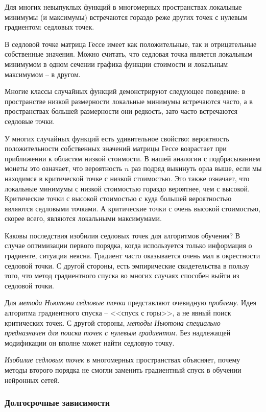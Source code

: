 \documentclass[%
	11pt,
	a4paper,
	utf8,
]{article}
\begin{document}
Для многих невыпуклых функций в многомерных пространствах локальные минимумы (и максимумы) встречаются гораздо реже других точек с нулевым градиентом: седловых точек.

В седловой точке матрица Гессе имеет как положительные, так и отрицательные собственные значения. Можно считать, что седловая точка является локальным минимумом в одном сечении графика функции стоимости и локальным максимумом -- в другом.

Многие классы случайных функций демонстрируют следующее поведение: в пространстве низкой размерности локальные минимумы встречаются часто, а в пространствах большей размерности они редкость, зато часто встречаются седловые точки.

У многих случайных функций есть удивительное свойство: вероятность положительности собственных значений матрицы Гессе возрастает при приближении к областям низкой стоимости. В нашей аналогии с подбрасыванием монеты это означает, что вероятность $ n $ раз подряд выкинуть орла выше, если мы находимся в критической точке с низкой стоимостью. Это также означает, что локальные минимумы с низкой стоимостью гораздо вероятнее, чем с высокой. Критические точки с высокой стоимостью с куда большей вероятностью являются седловыми точками. А критические точки с очень высокой стоимостью, скорее всего, являются локальными максимумами.

Каковы последствия изобилия седловых точек для алгоритмов обучения? В случае оптимизации первого порядка, когда используется только информация о градиенте, ситуация неясна. Градиент часто оказывается очень мал в окрестности седловой точки. С другой стороны, есть эмпирические свидетельства в пользу того, что метод градиентного спуска во многих случаях способен выйти из седловой точки.

Для \emph{метода Ньютона} \emph{седловые точки} представляют очевидную \emph{проблему}. Идея алгоритма градиентного спуска -- <<спуск с горы>>, а не явный поиск критических точек. С другой стороны, \emph{методы Ньютона специально предназначен для поиска точек с нулевым градиентом}. Без надлежащей модификации он вполне может найти седловую точку.

\emph{Изобилие седловых точек} в многомерных пространствах объясняет, почему методы второго порядка не смогли заменить градиентный спуск в обучении нейронных сетей.

\subsubsection{Долгосрочные зависимости}
\end{document}
